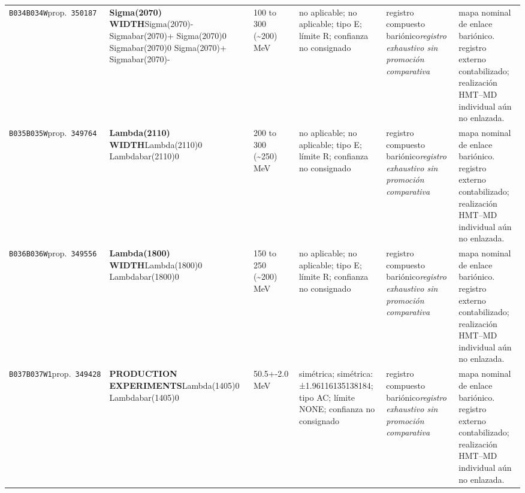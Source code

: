 \begin{landscape}
\begin{longtable}{L{1.85cm}L{4.45cm}L{2.35cm}L{4.05cm}L{3.35cm}L{7.15cm}}
\texttt{B034}\newline \texttt{B034W}\newline prop.\ \texttt{350187} & \textbf{Sigma(2070) WIDTH}\newline Sigma(2070)- \textbar{}\allowbreak{} Sigmabar(2070)+ \textbar{}\allowbreak{} Sigma(2070)0 \textbar{}\allowbreak{} Sigmabar(2070)0 \textbar{}\allowbreak{} Sigma(2070)+ \textbar{}\allowbreak{} Sigmabar(2070)- & 100 to 300 (\textasciitilde{}200)\,MeV & no aplicable; no aplicable; tipo E; límite R; confianza no consignado & registro compuesto bariónico\newline \emph{registro exhaustivo sin promoción comparativa} & mapa nominal de enlace bariónico. registro externo contabilizado; realización HMT--MD individual aún no enlazada. \\
\texttt{B035}\newline \texttt{B035W}\newline prop.\ \texttt{349764} & \textbf{Lambda(2110) WIDTH}\newline Lambda(2110)0 \textbar{}\allowbreak{} Lambdabar(2110)0 & 200 to 300 (\textasciitilde{}250)\,MeV & no aplicable; no aplicable; tipo E; límite R; confianza no consignado & registro compuesto bariónico\newline \emph{registro exhaustivo sin promoción comparativa} & mapa nominal de enlace bariónico. registro externo contabilizado; realización HMT--MD individual aún no enlazada. \\
\texttt{B036}\newline \texttt{B036W}\newline prop.\ \texttt{349556} & \textbf{Lambda(1800) WIDTH}\newline Lambda(1800)0 \textbar{}\allowbreak{} Lambdabar(1800)0 & 150 to 250 (\textasciitilde{}200)\,MeV & no aplicable; no aplicable; tipo E; límite R; confianza no consignado & registro compuesto bariónico\newline \emph{registro exhaustivo sin promoción comparativa} & mapa nominal de enlace bariónico. registro externo contabilizado; realización HMT--MD individual aún no enlazada. \\
\texttt{B037}\newline \texttt{B037W1}\newline prop.\ \texttt{349428} & \textbf{PRODUCTION EXPERIMENTS}\newline Lambda(1405)0 \textbar{}\allowbreak{} Lambdabar(1405)0 & 50.5+-2.0\,MeV & simétrica; simétrica: ±1.96116135138184; tipo AC; límite NONE; confianza no consignado & registro compuesto bariónico\newline \emph{registro exhaustivo sin promoción comparativa} & mapa nominal de enlace bariónico. registro externo contabilizado; realización HMT--MD individual aún no enlazada. \\

\end{longtable}
\end{landscape}
